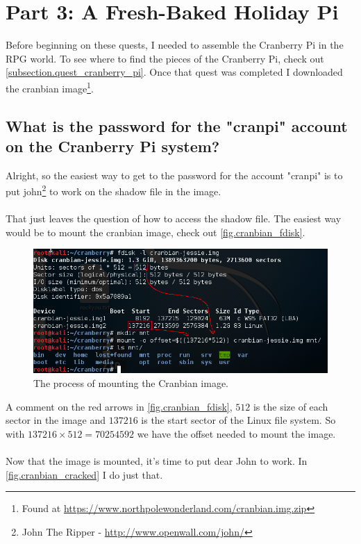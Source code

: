 \documentclass[writeup.tex]{subfiles}
\begin{document}
\section{Part 3: A Fresh-Baked Holiday Pi} \label{section.part3}
	Before beginning on these quests, I needed to assemble the Cranberry Pi in the RPG world. To see where to find the pieces of the Cranberry Pi, check out \autoref{subsection.quest_cranberry_pi}. Once that quest was completed I downloaded the cranbian image\footnote{Found at \url{https://www.northpolewonderland.com/cranbian.img.zip}}.
	
	\subsection{What is the password for the "cranpi" account on the Cranberry Pi system?}
		Alright, so the easiest way to get to the password for the account "cranpi" is to put john\footnote{John The Ripper - \url{http://www.openwall.com/john/}} to work on the shadow file in the image.\\
		\\
		That just leaves the question of how to access the shadow file. The easiest way would be to mount the cranbian image, check out \autoref{fig.cranbian_fdisk}.
		
		\begin{figure}[H]
			\centering
			\includegraphics[width=\linewidth]{screenshots/cranbian_fdisk}
			\caption{The process of mounting the Cranbian image.}
			\label{fig.cranbian_fdisk}
		\end{figure}
		
		A comment on the red arrows in \autoref{fig.cranbian_fdisk}, $512$ is the size of each sector in the image and $137216$ is the start sector of the Linux file system. So with $137216 \times 512 = 70254592$ we have the offset needed to mount the image.\\
		\\
		Now that the image is mounted, it's time to put dear John to work. In \autoref{fig.cranbian_cracked} I do just that.
\end{document}
